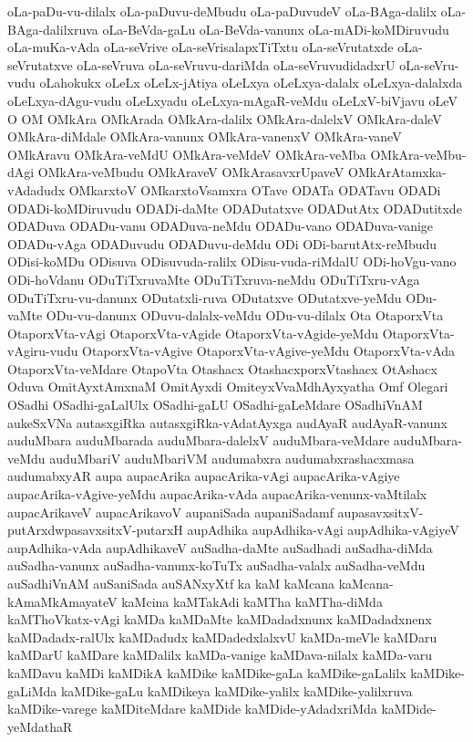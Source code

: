 {oLa-paDu-vu-dilalx
oLa-paDuvu-deMbudu
oLa-paDuvudeV
oLa-BAga-dalilx
oLa-BAga-dalilxruva
oLa-BeVda-gaLu
oLa-BeVda-vanunx
oLa-mADi-koMDiruvudu
oLa-muKa-vAda
oLa-seVrive
oLa-seVrisalapxTiTxtu
oLa-seVrutatxde
oLa-seVrutatxve
oLa-seVruva
oLa-seVruvu-dariMda
oLa-seVruvudidadxrU
oLa-seVru-vudu
oLahokukx
oLeLx
oLeLx-jAtiya
oLeLxya
oLeLxya-dalalx
oLeLxya-dalalxda
oLeLxya-dAgu-vudu
oLeLxyadu
oLeLxya-mAgaR-veMdu
oLeLxV-biVjavu
oLeV
O
OM
OMkAra
OMkArada
OMkAra-dalilx
OMkAra-dalelxV
OMkAra-daleV
OMkAra-diMdale
OMkAra-vanunx
OMkAra-vanenxV
OMkAra-vaneV
OMkAravu
OMkAra-veMdU
OMkAra-veMdeV
OMkAra-veMba
OMkAra-veMbu-dAgi
OMkAra-veMbudu
OMkAraveV
OMkArasavxrUpaveV
OMkArAtamxka-vAdadudx
OMkarxtoV
OMkarxtoVsamxra
OTave
ODATa
ODATavu
ODADi
ODADi-koMDiruvudu
ODADi-daMte
ODADutatxve
ODADutAtx
ODADutitxde
ODADuva
ODADu-vanu
ODADuva-neMdu
ODADu-vano
ODADuva-vanige
ODADu-vAga
ODADuvudu
ODADuvu-deMdu
ODi
ODi-barutAtx-reMbudu
ODisi-koMDu
ODisuva
ODisuvuda-ralilx
ODisu-vuda-riMdalU
ODi-hoVgu-vano
ODi-hoVdanu
ODuTiTxruvaMte
ODuTiTxruva-neMdu
ODuTiTxru-vAga
ODuTiTxru-vu-danunx
ODutatxli-ruva
ODutatxve
ODutatxve-yeMdu
ODu-vaMte
ODu-vu-danunx
ODuvu-dalalx-veMdu
ODu-vu-dilalx
Ota
OtaporxVta
OtaporxVta-vAgi
OtaporxVta-vAgide
OtaporxVta-vAgide-yeMdu
OtaporxVta-vAgiru-vudu
OtaporxVta-vAgive
OtaporxVta-vAgive-yeMdu
OtaporxVta-vAda
OtaporxVta-veMdare
OtapoVta
Otashacx
OtashacxporxVtashacx
OtAshacx
Oduva
OmitAyxtAmxnaM
OmitAyxdi
OmiteyxVvaMdhAyxyatha
Omf
Olegari
OSadhi
OSadhi-gaLalUlx
OSadhi-gaLU
OSadhi-gaLeMdare
OSadhiVnAM
aukeSxVNa
autasxgiRka
autasxgiRka-vAdatAyxga
audAyaR
audAyaR-vanunx
auduMbara
auduMbarada
auduMbara-dalelxV
auduMbara-veMdare
auduMbara-veMdu
auduMbariV
auduMbariVM
audumabxra
audumabxrashacxmasa
audumabxyAR
aupa
aupacArika
aupacArika-vAgi
aupacArika-vAgiye
aupacArika-vAgive-yeMdu
aupacArika-vAda
aupacArika-venunx-vaMtilalx
aupacArikaveV
aupacArikavoV
aupaniSada
aupaniSadamf
aupasavxsitxV-putArxdwpasavxsitxV-putarxH
aupAdhika
aupAdhika-vAgi
aupAdhika-vAgiyeV
aupAdhika-vAda
aupAdhikaveV
auSadha-daMte
auSadhadi
auSadha-diMda
auSadha-vanunx
auSadha-vanunx-koTuTx
auSadha-valalx
auSadha-veMdu
auSadhiVnAM
auSaniSada
auSANxyXtf
ka
kaM
kaMcana
kaMcana-kAmaMkAmayateV
kaMcina
kaMTakAdi
kaMTha
kaMTha-diMda
kaMThoVkatx-vAgi
kaMDa
kaMDaMte
kaMDadadxnunx
kaMDadadxnenx
kaMDadadx-ralUlx
kaMDadudx
kaMDadedxlalxvU
kaMDa-meVle
kaMDaru
kaMDarU
kaMDare
kaMDalilx
kaMDa-vanige
kaMDava-nilalx
kaMDa-varu
kaMDavu
kaMDi
kaMDikA
kaMDike
kaMDike-gaLa
kaMDike-gaLalilx
kaMDike-gaLiMda
kaMDike-gaLu
kaMDikeya
kaMDike-yalilx
kaMDike-yalilxruva
kaMDike-varege
kaMDiteMdare
kaMDide
kaMDide-yAdadxriMda
kaMDide-yeMdathaR
}
